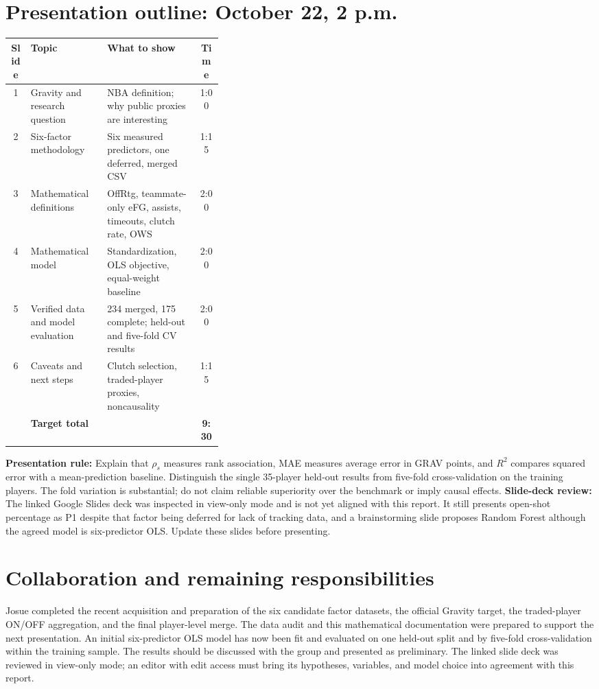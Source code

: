 \documentclass[11pt]{article}
\begin{document}
\section{Presentation outline: October 22, 2 p.m.}
\begin{center}
\small
\begin{tabularx}{\linewidth}{@{}cp{0.36\linewidth}Xc@{}}
\toprule
\textbf{Slide} & \textbf{Topic} & \textbf{What to show} & \textbf{Time}\\
\midrule
1 & Gravity and research question & NBA definition; why public proxies are interesting & 1:00\\
2 & Six-factor methodology & Six measured predictors, one deferred, merged CSV & 1:15\\
3 & Mathematical definitions & OffRtg, teammate-only eFG, assists, timeouts, clutch rate, OWS & 2:00\\
4 & Mathematical model & Standardization, OLS objective, equal-weight baseline & 2:00\\
5 & Verified data and model evaluation & 234 merged, 175 complete; held-out and five-fold CV results & 2:00\\
6 & Caveats and next steps & Clutch selection, traded-player proxies, noncausality & 1:15\\
\midrule
 & \textbf{Target total} & & \textbf{9:30}\\
\bottomrule
\end{tabularx}
\end{center}
\textbf{Presentation rule:} Explain that $\rho_s$ measures rank
association, MAE measures average error in GRAV points, and $R^2$
compares squared error with a mean-prediction baseline. Distinguish the
single 35-player held-out results from five-fold cross-validation on the
training players. The fold variation is substantial; do not claim
reliable superiority over the benchmark or imply causal effects.
\textbf{Slide-deck review:} The linked Google Slides deck was inspected in
view-only mode and is not yet aligned with this report. It still presents
open-shot percentage as P1 despite that factor being deferred for lack of
tracking data, and a brainstorming slide proposes Random Forest although
the agreed model is six-predictor OLS. Update these slides before presenting.

\section{Collaboration and remaining responsibilities}
Josue completed the recent acquisition and preparation of the six candidate
factor datasets, the official Gravity target, the traded-player ON/OFF
aggregation, and the final player-level merge. The data audit and this mathematical documentation were prepared to
support the next presentation. An initial six-predictor OLS model has now
been fit and evaluated on one held-out split and by five-fold
cross-validation within the training sample. The results should be
discussed with the group and presented as preliminary. The linked slide
deck was reviewed in view-only mode; an editor with edit access must bring
its hypotheses, variables, and model choice into agreement with this report.
\end{document}

